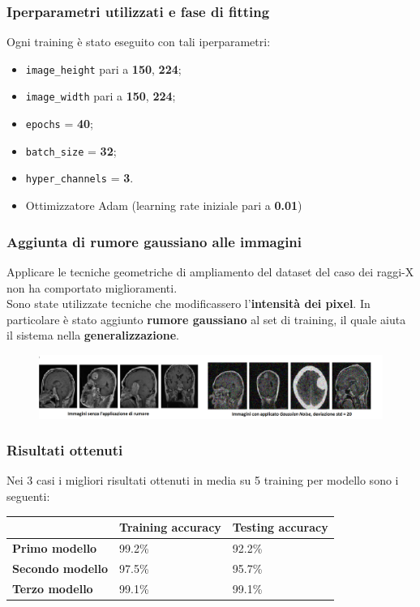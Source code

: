 \documentclass{beamer}
\begin{document}
\begin{frame}[fragile]
	\frametitle{Iperparametri utilizzati e fase di fitting}
		Ogni training è stato eseguito con tali iperparametri:
		\begin{itemize}
			\item \lstinline[language = Python]{image_height} pari a \textbf{150}, \textbf{224};
			\item \lstinline[language = Python]{image_width} pari a \textbf{150}, \textbf{224};
			\item \lstinline[language = Python]{epochs} = \textbf{40};
			\item \lstinline[language = Python]{batch_size} = \textbf{32};
			\item \lstinline[language = Python]{hyper_channels} = \textbf{3}.
			\item Ottimizzatore Adam (learning rate iniziale pari a \textbf{0.01})
		\end{itemize}
\end{frame}

\begin{frame}
	\frametitle{Aggiunta di rumore gaussiano alle immagini}
	Applicare le tecniche geometriche di ampliamento del dataset del caso dei raggi-X non ha comportato miglioramenti.\\
	Sono state utilizzate tecniche che modificassero l'\textbf{intensità dei pixel}.
	In particolare è stato aggiunto \textbf{rumore gaussiano} al set di training,
	 il quale aiuta il sistema nella \textbf{generalizzazione}. 
	 \begin{figure}
		\includegraphics[width=1\textwidth]{images-noise-var-20.png}
	\end{figure}
	

	 
\end{frame}





\begin{frame}
	\frametitle{Risultati ottenuti}
			Nei 3 casi i migliori risultati ottenuti in media su 5 training per modello sono i seguenti:
			\begin{table}[]
				\begin{tabular}{lll}
													 & \textbf{Training accuracy} & \textbf{Testing accuracy} \\ \hline
				\multicolumn{1}{l|}{\textbf{Primo modello}}   & 99.2\%            & 92.2\%           \\
				\multicolumn{1}{l|}{\textbf{Secondo modello}} & 97.5\%            & 95.7\%           \\
				\multicolumn{1}{l|}{\textbf{Terzo modello}}   & 99.1\%            & 99.1\%          
				\end{tabular}
				\end{table}
	\end{frame}
\end{document}
